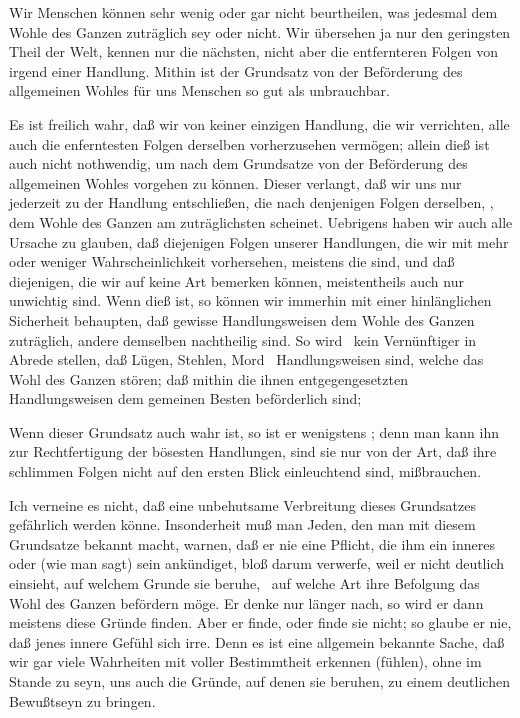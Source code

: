  Wir Menschen können sehr wenig oder gar nicht beurtheilen, was jedesmal dem Wohle des Ganzen zuträglich sey oder nicht. Wir übersehen ja nur den geringsten Theil der Welt, kennen nur die nächsten, nicht aber die entfernteren Folgen von irgend einer Handlung. Mithin ist der Grundsatz von der Beförderung des allgemeinen Wohles für uns Menschen so gut als unbrauchbar.\par
{} Es ist freilich wahr, daß wir von keiner einzigen Handlung, die wir verrichten, alle auch die enferntesten Folgen derselben vorherzusehen vermögen; allein dieß ist auch nicht nothwendig, um nach dem Grundsatze von der Beförderung des allgemeinen Wohles vorgehen zu können. Dieser verlangt, daß wir uns nur jederzeit zu der Handlung entschließen, die nach denjenigen Folgen derselben, , dem Wohle des Ganzen am zuträglichsten scheinet. Uebrigens haben wir auch alle Ursache zu glauben, daß diejenigen Folgen unserer Handlungen, die wir mit mehr oder weniger Wahrscheinlichkeit vorhersehen, meistens die  sind, und daß diejenigen, die wir auf keine Art bemerken können, meistentheils auch nur unwichtig sind. Wenn dieß ist, so können wir immerhin mit einer hinlänglichen Sicherheit behaupten, daß gewisse Handlungsweisen dem Wohle des Ganzen zuträglich, andere demselben nachtheilig sind. So wird \zB\ kein Vernünftiger in Abrede stellen, daß Lügen, Stehlen, Mord \udgl\  Handlungsweisen sind, welche das Wohl des Ganzen stören; daß mithin die ihnen entgegengesetzten Handlungsweisen dem gemeinen Besten beförderlich sind; \usw\par
{} Wenn dieser Grundsatz auch wahr ist, so ist er wenigstens ; denn man kann ihn zur Rechtfertigung der bösesten Handlungen, sind sie nur von der Art, daß ihre schlimmen Folgen nicht auf den ersten Blick einleuchtend sind, mißbrauchen.\par
{} Ich verneine es nicht, daß eine unbehutsame Verbreitung dieses Grundsatzes gefährlich werden könne. Insonderheit muß man Jeden, den man mit diesem Grundsatze bekannt macht, warnen, daß er nie eine Pflicht, die ihm ein inneres  oder (wie man sagt) sein  ankündiget, bloß darum verwerfe, weil er nicht deutlich einsieht, auf welchem Grunde sie beruhe, \dh\ auf welche Art ihre Befolgung das Wohl des Ganzen befördern möge. Er denke nur länger nach, so wird er dann meistens diese Gründe finden. Aber er finde, oder finde sie nicht; so glaube er nie, daß jenes innere Gefühl sich irre. Denn es ist eine allgemein bekannte Sache, daß wir gar viele Wahrheiten mit voller Bestimmtheit erkennen (fühlen), ohne im Stande zu seyn, uns auch die Gründe, auf denen sie beruhen, zu einem deutlichen Bewußtseyn zu bringen.~

